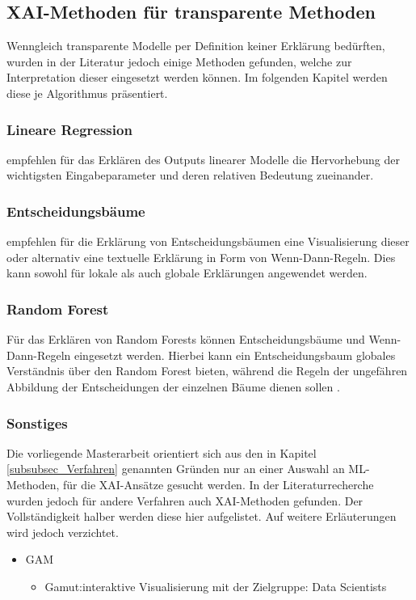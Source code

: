 \subsection{XAI-Methoden für transparente Methoden}
Wenngleich transparente Modelle per Definition keiner Erklärung bedürften, wurden in der Literatur jedoch einige Methoden gefunden, welche zur Interpretation dieser eingesetzt werden können. Im folgenden Kapitel werden diese je Algorithmus präsentiert.

\subsubsection{Lineare Regression}
\cite{westin2020building} empfehlen für das Erklären des Outputs linearer Modelle die Hervorhebung der wichtigsten Eingabeparameter und deren relativen Bedeutung zueinander. 
\subsubsection{Entscheidungsbäume}
\cite{guidotti2018survey} empfehlen für die Erklärung von Entscheidungsbäumen eine Visualisierung dieser oder alternativ eine textuelle Erklärung in Form von Wenn-Dann-Regeln. Dies kann sowohl für lokale als auch globale Erklärungen angewendet werden.

\subsubsection{Random Forest}
Für das Erklären von Random Forests können Entscheidungsbäume und Wenn-Dann-Regeln eingesetzt werden. Hierbei kann ein Entscheidungsbaum globales Verständnis über den Random Forest bieten, während die Regeln der ungefähren Abbildung der Entscheidungen der einzelnen Bäume dienen sollen \cite{chen2021novel}.

\subsubsection{Sonstiges}
Die vorliegende Masterarbeit orientiert sich aus den in Kapitel \ref{subsubsec_Verfahren} genannten Gründen nur an einer Auswahl an ML-Methoden, für die XAI-Ansätze gesucht werden. In der Literaturrecherche wurden jedoch für andere Verfahren auch XAI-Methoden gefunden. Der Vollständigkeit halber werden diese hier aufgelistet. Auf weitere Erläuterungen wird jedoch verzichtet. 
\begin{itemize}
    \item GAM
    \begin{itemize}
        \item Gamut:interaktive Visualisierung mit der Zielgruppe: Data Scientists \cite{hohman2019gamut} 
    \end{itemize}
\end{itemize}